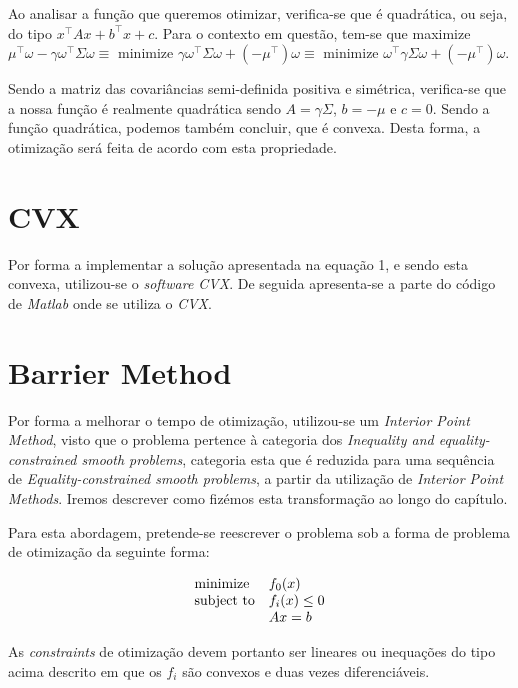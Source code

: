 \documentclass[a4paper]{IEEEtran}
\begin{document}
Ao analisar a função que queremos otimizar, verifica-se que é quadrática, ou seja, do tipo $x^\top Ax+b^\top x+c$.
Para o contexto em questão, tem-se que maximize $\mu^\top \omega - \gamma \omega^\top \Sigma \omega \equiv$ minimize $\gamma \omega^\top \Sigma \omega + (- \mu^\top) \omega \equiv$ minimize $\omega^\top \gamma \Sigma \omega + (- \mu^\top) \omega$.

Sendo a matriz das covariâncias semi-definida positiva e simétrica, verifica-se que a nossa função é realmente quadrática sendo $A = \gamma \Sigma$, $b = -\mu$ e $c=0$. Sendo a função quadrática, podemos também concluir, que é convexa. Desta forma, a otimização será feita de acordo com esta propriedade.

\section{CVX}
\label{sec:cvx}
Por forma a implementar a solução apresentada na equação 1, e sendo esta convexa, utilizou-se o \textit{software CVX}\cite{CVX}. De seguida apresenta-se a parte do código de \textit{Matlab} onde se utiliza o \textit{CVX}.



\section{Barrier Method}
\label{sec:barrier-method}

Por forma a melhorar o tempo de otimização, utilizou-se um \textit{Interior Point Method}, visto que o problema pertence à categoria dos \textit{Inequality and equality-constrained smooth problems}, categoria esta que é reduzida para uma sequência de \textit{Equality-constrained smooth problems}, a partir da utilização de \textit{Interior Point Methods}. Iremos descrever como fizémos esta transformação ao longo do capítulo.

Para esta abordagem, pretende-se reescrever o problema sob a forma de problema de otimização da seguinte forma:

\begin{equation}
\label{eq.ineq}
\begin{array}[t]{ll} \text{minimize} & f_0(x) \\
\text{subject to} & f_i(x) \leq 0 \\ &  Ax=b \end{array}
\end{equation}

As \textit{constraints} de otimização devem portanto ser lineares ou inequações do tipo acima descrito em que os $f_i$ são convexos e duas vezes diferenciáveis.
\end{document}
